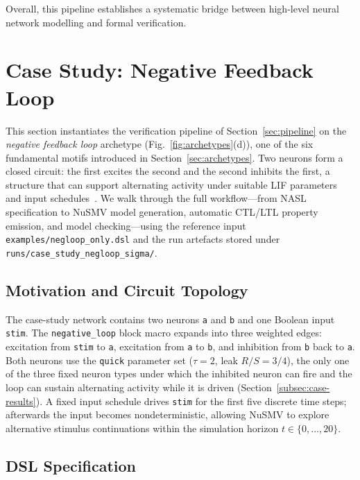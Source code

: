 \documentclass[
]{ceurart}
\begin{document}
Overall, this pipeline establishes a systematic bridge between high-level
neural network modelling and formal verification.

\section{Case Study: Negative Feedback Loop}
\label{sec:case-study}

This section instantiates the verification pipeline of Section~\ref{sec:pipeline} on
the \emph{negative feedback loop} archetype (Fig.~\ref{fig:archetypes}(d)), one of the
six fundamental motifs introduced in Section~\ref{sec:archetypes}. Two neurons form a
closed circuit: the first excites the second and the second inhibits the first, a
structure that can support alternating activity under suitable LIF parameters and input
schedules~\cite{DeMaria2020}. We walk through the full workflow---from \textsc{NASL}
specification to NuSMV model generation, automatic CTL/LTL property emission, and model
checking---using the reference input \texttt{examples/negloop\_only.dsl} and the run
artefacts stored under \texttt{runs/case\_study\_negloop\_sigma/}.

\subsection{Motivation and Circuit Topology}

The case-study network contains two neurons \texttt{a} and \texttt{b} and one Boolean
input \texttt{stim}. The \texttt{negative\_loop} block macro expands into three weighted
edges: excitation from \texttt{stim} to \texttt{a}, excitation from \texttt{a} to
\texttt{b}, and inhibition from \texttt{b} back to \texttt{a}. Both neurons use the
\texttt{quick} parameter set ($\tau = 2$, leak $R/S = 3/4$), the only one of the three
fixed neuron types under which the inhibited neuron can fire and the loop can sustain
alternating activity while it is driven (Section~\ref{subsec:case-results}). A fixed input schedule drives
\texttt{stim} for the first five discrete time steps; afterwards the input becomes
nondeterministic, allowing NuSMV to explore alternative stimulus continuations within the
simulation horizon $t \in \{0,\ldots,20\}$.

\subsection{DSL Specification}
\end{document}
